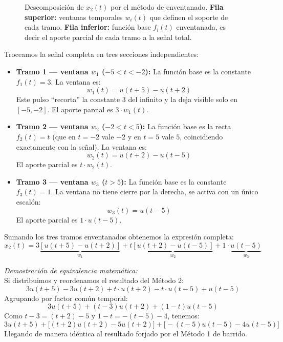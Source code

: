 \documentclass[10pt,a4paper]{article}
\begin{document}
\begin{enumerate}[label=\textbf{\alph*)}]
        \begin{figure}[H]
            \centering
            
            \caption{Descomposición de $x_2(t)$ por el método de enventanado. \textbf{Fila superior:} ventanas temporales $w_i(t)$ que definen el soporte de cada tramo. \textbf{Fila inferior:} función base $f_i(t)$ enventanada, es decir el aporte parcial de cada tramo a la señal total.}
            \label{fig:ejer2b_env}
        \end{figure}

        Troceamos la señal completa en tres secciones independientes:
        \begin{itemize}
            \item \textbf{Tramo 1 --- {\color{utnblue}ventana $w_1$} ($-5 < t < -2$):} La función base es la constante $f_1(t)=3$. La ventana es:
            \[ w_1(t) = u(t+5) - u(t+2) \]
            Este pulso ``recorta'' la constante $3$ del infinito y la deja visible solo en $[-5,-2]$. El aporte parcial es $3\cdot w_1(t)$.

            \item \textbf{Tramo 2 --- {\color{utnred}ventana $w_2$} ($-2 < t < 5$):} La función base es la recta $f_2(t)=t$ (que en $t=-2$ vale $-2$ y en $t=5$ vale $5$, coincidiendo exactamente con la señal). La ventana es:
            \[ w_2(t) = u(t+2) - u(t-5) \]
            El aporte parcial es $t\cdot w_2(t)$.

            \item \textbf{Tramo 3 --- {\color{utngreen}ventana $w_3$} ($t > 5$):} La función base es la constante $f_3(t)=1$. La ventana no tiene cierre por la derecha, se activa con un único escalón:
            \[ w_3(t) = u(t-5) \]
            El aporte parcial es $1\cdot u(t-5)$.
        \end{itemize}
        Sumando los tres tramos enventanados obtenemos la expresión completa:
        \[ x_2(t) = 3 \underbrace{[u(t+5) - u(t+2)]}_{w_1} + t \underbrace{[u(t+2) - u(t-5)]}_{w_2} + 1 \cdot \underbrace{u(t-5)}_{w_3} \]
        
        \textit{Demostración de equivalencia matemática:} \\
        Si distribuimos y reordenamos el resultado del Método 2:
        \[ 3u(t+5) - 3u(t+2) + t \cdot u(t+2) - t \cdot u(t-5) + u(t-5) \]
        Agrupando por factor común temporal:
        \[ 3u(t+5) + (t-3)u(t+2) + (1-t)u(t-5) \]
        Como $t-3 = (t+2) - 5$ y $1-t = -(t-5) - 4$, tenemos:
        \[ 3u(t+5) + \Big[(t+2)u(t+2) - 5u(t+2)\Big] + \Big[-(t-5)u(t-5) - 4u(t-5)\Big] \]
        Llegando de manera idéntica al resultado forjado por el Método 1 de barrido.
	\end{enumerate}
\end{document}
